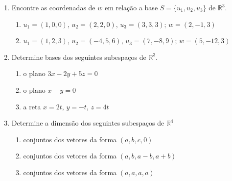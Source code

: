 \documentclass[a4paper,5pt]{amsbook}
\begin{document}
\begin{enumerate}
    \vspace{0.5cm}
    \item Encontre as coordenadas de $w$ em rela\c{c}\~ao a base $S=\{u_1,u_2,u_3\}$
        de $\mathbb{R}^3$.
        \begin{enumerate}
            \item $u_1=(1,0,0)$, $u_2=(2,2,0)$, $u_3=(3,3,3)$; $w=(2,-1,3)$
            \item $u_1=(1,2,3)$, $u_2=(-4,5,6)$, $u_3=(7,-8,9)$; $w=(5,-12,3)$
        \end{enumerate}

    \vspace{0.5cm}
    \item Determine bases dos seguintes subespa\c{c}os de $\mathbb{R}^3$.
        \begin{enumerate}
            \item o plano $3x-2y+5z=0$
            \item o plano $x-y=0$
            \item a reta $x=2t$, $y=-t$, $z=4t$
        \end{enumerate}

    \vspace{0.5cm}
    \item Determine a dimens\~ao dos seguintes subespa\c{c}os de $\mathbb{R}^4$
        \begin{enumerate}
            \item conjuntos dos vetores da forma $(a,b,c,0)$
            \item conjuntos dos vetores da forma $(a,b,a-b,a+b)$
            \item conjuntos dos vetores da forma $(a,a,a,a)$
        \end{enumerate}
\end{enumerate}
\end{document}
